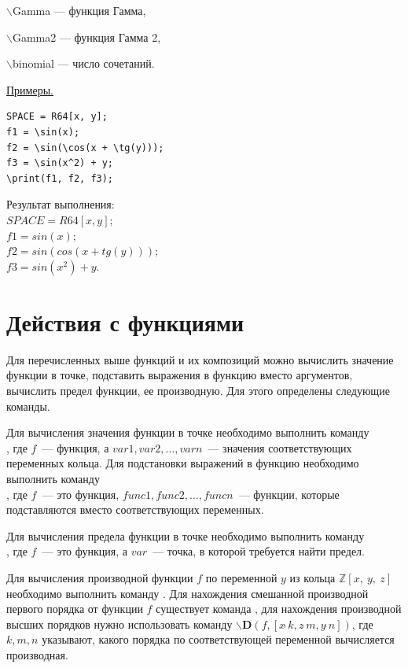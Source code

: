  $\backslash$Gamma --- функция Гамма,

 $\backslash$Gamma2 --- функция Гамма 2,

 $\backslash$binomial --- число сочетаний. 


\smallskip

\underline{Примеры. }

\vspace*{-3mm}
\begin{verbatim}
SPACE = R64[x, y];
f1 = \sin(x);
f2 = \sin(\cos(x + \tg(y)));
f3 = \sin(x^2) + y;
\print(f1, f2, f3);
\end{verbatim}

\vspace*{-3mm}
Результат выполнения:\\
$SPACE=R64[x,y];$\\
$f1 = sin(x); $\\
$f2 = sin(cos(x+tg(y))); $\\
$f3 = sin(x^{2})+y. $


\section{Действия с функциями}

Для перечисленных выше функций и их композиций можно вычислить значение функции в точке,  подставить выражения в функцию вместо аргументов,  вычислить предел функции,  ее производную.  Для этого определены следующие команды. 

 
Для вычисления значения функции в точке необходимо выполнить команду \\
, 
где $f$~---  функция,  а $var1, var2, \ldots, varn$~--- значения соответствующих переменных кольца. 
 Для подстановки выражений в функцию необходимо выполнить команду \\
,  где $f$~--- это функция,  
$func1, func2, \ldots,  funcn$~--- функции,  которые подставляются вместо соответствующих переменных. 

 Для вычисления предела функции в точке необходимо выполнить команду \\
,  
где $f$~--- это  функция,  а $var$~--- точка,  в которой требуется найти предел. 

 Для вычисления производной функции $f$ по переменной $y$ из кольца $\mathbb{Z}[x,\ y,\ z]$
 необходимо выполнить команду  .  Для нахождения смешанной производной первого порядка от функции $f$ существует команда 
,  для нахождения производной высших порядков нужно использовать команду $\backslash {\mathbf {D}} (f, [x \widehat{\ }{} k, z \widehat{\ }{} m, y \widehat{\ }{} n])$,  где $k,  m,  n$ указывают,  какого порядка по соответствующей переменной вычисляется производная. 


